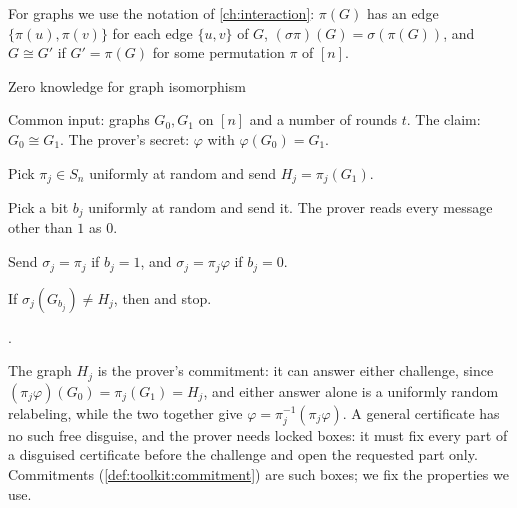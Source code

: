 \begin{refsection}
For graphs we use the notation of \cref{ch:interaction}: $\pi(G)$ has an edge $\{\pi(u),\pi(v)\}$ for each edge $\{u,v\}$ of $G$, $(\sigma\pi)(G)=\sigma(\pi(G))$, and $G\cong G'$ if $G'=\pi(G)$ for some permutation $\pi$ of $[n]$.

\begin{protocol}{Zero knowledge for graph isomorphism}\label{prot:zeroknowledge:gi}
\item[\act{V}] Common input: graphs $G_0,G_1$ on $[n]$ and a number of rounds $t$. The claim: $G_0\cong G_1$. The prover's secret: $\varphi$ with $\varphi(G_0)=G_1$.
\item[\msg{P}{V}] Pick $\pi_j\in S_n$ uniformly at random and send $H_j=\pi_j(G_1)$.
\item[\msg{V}{P}] Pick a bit $b_j$ uniformly at random and send it. The prover reads every message other than $1$ as $0$.
\item[\msg{P}{V}] Send $\sigma_j=\pi_j$ if $b_j=1$, and $\sigma_j=\pi_j\varphi$ if $b_j=0$.
\item[\act{V}] If $\sigma_j(G_{b_j})\ne H_j$, then \rej{} and stop.
\item[\act{V}] \acc.
\end{protocol}

The graph $H_j$ is the prover's commitment: it can answer either challenge, since $(\pi_j\varphi)(G_0)=\pi_j(G_1)=H_j$, and either answer alone is a uniformly random relabeling, while the two together give $\varphi=\pi_j^{-1}(\pi_j\varphi)$. A general certificate has no such free disguise, and the prover needs locked boxes: it must fix every part of a disguised certificate before the challenge and open the requested part only. Commitments (\cref{def:toolkit:commitment}) are such boxes; we fix the properties we use.



\end{refsection}

